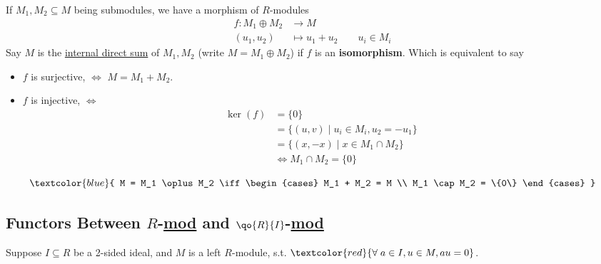 \begin{definition}
	If \( M_1, M_2 \subseteq M \) being submodules, we have a morphism of \( R \)-modules
	\[
		\begin{aligned}
			f: M_1 \oplus M_2 & \longrightarrow M                        \\
			(u_1, u_2)        & \longmapsto u_1 + u_2 \qquad u_i \in M_i
		\end{aligned}
	\]
	Say \( M \) is the \underline{internal direct sum} of \( M_1, M_2 \) (write \( M = M_1 \oplus M_2 \))
	if \( f \) is an \textbf{isomorphism}. Which is equivalent to say
	\begin{itemize}
		\item \( f \) is surjective, \( \iff \) \( M = M_1 + M_2 \).
		\item \( f \) is injective, \( \iff \)
		      \[
			      \begin{aligned}
				      \ker(f) & = \{0\}                                     \\
				              & = \{(u,v) \; | \; u_i \in M_i, u_2 = -u_1\} \\
				              & = \{(x,-x)\; | \; x\in M_1 \cap M_2\}       \\
				              & \iff M_1 \cap M_2 = \{0\}
			      \end{aligned}
		      \]
	\end{itemize}
	\begin{conclusion}
		\leavevmode
		\[
			\textcolor{blue}{
				M = M_1 \oplus M_2 \iff
				\begin{cases}
					M_1 + M_2 = M \\
					M_1 \cap M_2 = \{0\}
				\end{cases}
			}
		\]
	\end{conclusion}
\end{definition}

\subsection{Functors Between \( R \)-\underline{mod} and \( \qo{R}{I}\)-\underline{mod}}

Suppose \( I \subseteq R \) be a 2-sided ideal, and \( M \) is a left \( R \)-module, s.t. \(
\textcolor{red}{\forall \; a \in I, u\in M, au = 0} \).

